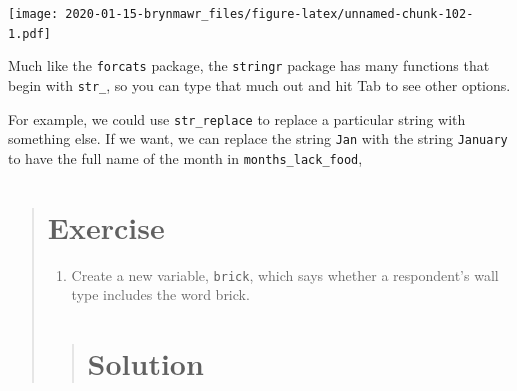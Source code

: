 \documentclass[]{book}
\newenvironment{Shaded}{\begin{snugshade}}{\end{snugshade}}
\newcommand{\KeywordTok}[1]{\textcolor[rgb]{0.13,0.29,0.53}{\textbf{#1}}}
\newcommand{\DataTypeTok}[1]{\textcolor[rgb]{0.13,0.29,0.53}{#1}}
\newcommand{\StringTok}[1]{\textcolor[rgb]{0.31,0.60,0.02}{#1}}
\newcommand{\OperatorTok}[1]{\textcolor[rgb]{0.81,0.36,0.00}{\textbf{#1}}}
\newcommand{\NormalTok}[1]{#1}
\providecommand{\tightlist}{%
  \setlength{\itemsep}{0pt}\setlength{\parskip}{0pt}}
\begin{document}
\texttt{[image: 2020-01-15-brynmawr\_files/figure-latex/unnamed-chunk-102-1.pdf]}

Much like the \texttt{forcats} package, the \texttt{stringr} package has
many functions that begin with \texttt{str\_}, so you can type that much
out and hit Tab to see other options.

For example, we could use \texttt{str\_replace} to replace a particular
string with something else. If we want, we can replace the string
\texttt{Jan} with the string \texttt{January} to have the full name of
the month in \texttt{months\_lack\_food},

\begin{Shaded}
\end{Shaded}

\begin{quote}
\section{Exercise}\label{exercise-17}

\begin{enumerate}
\def\labelenumi{\arabic{enumi}.}
\tightlist
\item
  Create a new variable, \texttt{brick}, which says whether a
  respondent's wall type includes the word brick.
\end{enumerate}

\begin{quote}
\section{Solution}\label{solution-19}

\begin{Shaded}
\end{Shaded}
\end{quote}
\end{quote}
\end{document}
